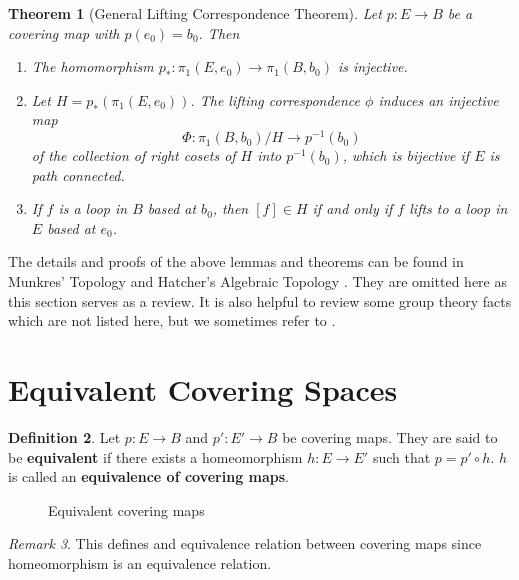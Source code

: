 \documentclass{amsart}
\newtheorem{theorem}{Theorem}[section]
\theoremstyle{definition}
\newtheorem{definition}[theorem]{Definition}
\theoremstyle{remark}
\newtheorem{remark}[theorem]{Remark}
\numberwithin{equation}{section}
\begin{document}
\begin{theorem} [General Lifting Correspondence Theorem] Let $p : E \to B$ be a covering map with $p(e_0) = b_0$. Then
\begin{enumerate}
    \item The homomorphism $p_\ast : \pi_1(E, e_0) \to \pi_1(B, b_0)$ is injective.
    \item Let $H = p_\ast(\pi_1(E, e_0))$. The lifting correspondence $\phi$ induces an injective map
    \[
    \Phi : \pi_1(B, b_0)/H \to p^{-1}(b_0)
    \]
    of the collection of right cosets of $H$ into $p^{-1}(b_0)$, which is bijective if $E$ is path connected.
    \item If $f$ is a loop in $B$ based at $b_0$, then $[f] \in H$ if and only if $f$ lifts to a loop in $E$ based at $e_0$.
\end{enumerate}

\end{theorem}

The details and proofs of the above lemmas and theorems can be found in Munkres' Topology \cite{mun} and Hatcher's Algebraic Topology \cite{at}. They are omitted here as this section serves as a review. It is also helpful to review some group theory facts which are not listed here, but we sometimes refer to \cite{gal}.

\section{Equivalent Covering Spaces}

\begin{definition}
    Let $p : E \to B$ and $p' : E' \to B$ be covering maps. They are said to be \textbf{equivalent} if there exists a homeomorphism $h : E \to E'$ such that $p = p' \circ h$. $h$ is called an \textbf{equivalence of covering maps}.
\end{definition}

\begin{figure}
    \centering
    \caption{Equivalent covering maps}
\end{figure}

\begin{remark}
    This defines and equivalence relation between covering maps since homeomorphism is an equivalence relation.
\end{remark}
\end{document}
